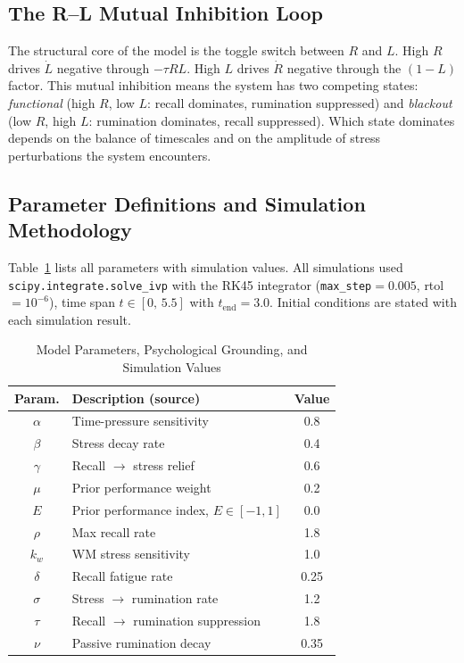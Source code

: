 \subsection{The R--L Mutual Inhibition Loop}

The structural core of the model is the toggle switch between $R$
and $L$. High $R$ drives $\dot{L}$ negative through $-\tau RL$.
High $L$ drives $\dot{R}$ negative through the $(1-L)$ factor.
This mutual inhibition means the system has two competing states:
\emph{functional} (high $R$, low $L$: recall dominates,
rumination suppressed) and \emph{blackout} (low $R$, high $L$:
rumination dominates, recall suppressed). Which state dominates
depends on the balance of timescales and on the amplitude of
stress perturbations the system encounters.

\subsection{Parameter Definitions and Simulation Methodology}

Table~\ref{tab:params} lists all parameters with simulation values.
All simulations used \mbox{\texttt{scipy.integrate.solve\_ivp}} with
the RK45 integrator (\texttt{max\_step}$=0.005$, rtol$=10^{-6}$),
time span $t\in[0,\,5.5]$ with $t_{\mathrm{end}}=3.0$. Initial
conditions are stated with each simulation result.

\begin{table}[h]
\caption{Model Parameters, Psychological Grounding, and Simulation Values}
\label{tab:params}
\centering
\renewcommand{\arraystretch}{1.2}
\begin{tabular}{clc}
\toprule
\textbf{Param.} & \textbf{Description (source)} & \textbf{Value} \\
\midrule
$\alpha$ & Time-pressure sensitivity                        & 0.8  \\
$\beta$  & Stress decay rate                                & 0.4  \\
$\gamma$ & Recall $\to$ stress relief                       & 0.6  \\
$\mu$    & Prior performance weight                         & 0.2  \\
$E$      & Prior performance index, $E\in[-1,1]$            & 0.0  \\
$\rho$   & Max recall rate~\cite{baddeley1986}              & 1.8  \\
$k_w$    & WM stress sensitivity~\cite{baddeley1986}        & 1.0  \\
$\delta$ & Recall fatigue rate                              & 0.25 \\
$\sigma$ & Stress $\to$ rumination rate~\cite{eysenck2007} & 1.2  \\
$\tau$   & Recall $\to$ rumination suppression~\cite{anderson2003} & 1.8  \\
$\nu$    & Passive rumination decay~\cite{borkovec1994}     & 0.35 \\
\bottomrule
\end{tabular}
\end{table}

